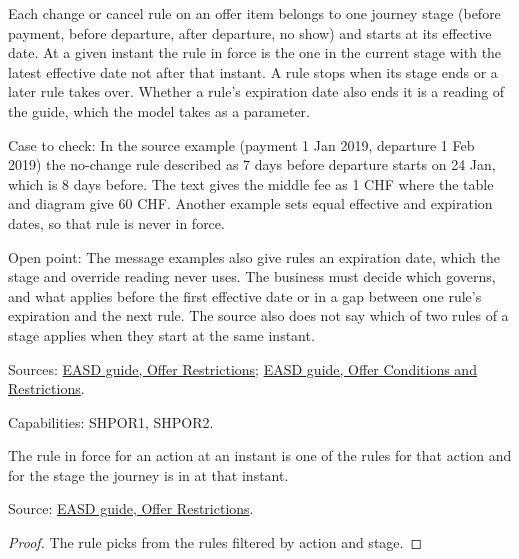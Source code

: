\begin{definition}
  \label{def:offers-restriction-in-force}
  Each change or cancel rule on an offer item belongs to one journey stage
  (before payment, before departure, after departure, no show) and starts at
  its effective date. At a given instant the rule in force is the one in the
  current stage with the latest effective date not after that instant. A
  rule stops when its stage ends or a later rule takes over. Whether a
  rule's expiration date also ends it is a reading of the guide, which the
  model takes as a parameter.

  Case to check: In the source example (payment 1 Jan 2019, departure 1 Feb
  2019) the no-change rule described as 7 days before departure starts on 24
  Jan, which is 8 days before. The text gives the middle fee as 1 CHF where
  the table and diagram give 60 CHF. Another example sets equal effective
  and expiration dates, so that rule is never in force.

  Open point: The message examples also give rules an expiration date, which
  the stage and override reading never uses. The business must decide which
  governs, and what applies before the first effective date or in a gap
  between one rule's expiration and the next rule. The source also does not
  say which of two rules of a stage applies when they start at the same
  instant.

  Sources: \href{https://standards.atlassian.net/wiki/spaces/EASD/pages/574259692/Offer+Restrictions}{EASD guide, Offer Restrictions};
  \href{https://standards.atlassian.net/wiki/spaces/EASD/pages/574816307/Offer+Conditions+and+Restrictions}{EASD guide, Offer Conditions and Restrictions}.

  Capabilities: SHPOR1, SHPOR2.
\end{definition}

\begin{theorem}
  \label{thm:offers-rule-stage}
  The rule in force for an action at an instant is one of the rules for
  that action and for the stage the journey is in at that instant.

  Source: \href{https://standards.atlassian.net/wiki/spaces/EASD/pages/574259692/Offer+Restrictions}{EASD guide, Offer Restrictions}.
\end{theorem}
\begin{proof}
  The rule picks from the rules filtered by action and stage.
\end{proof}

